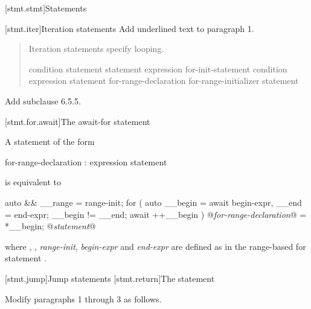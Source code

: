 
[stmt.stmt]{Statements}%

\setcounter{section}{4}
[stmt.iter]{Iteration statements}%
Add underlined text to paragraph 1.

\begin{quote}
\pnum
Iteration statements specify looping.

%
%
%
%
\begin{bnf}
	\br
	 condition \terminal{)} statement\br
	 statement  expression \terminal{) ;}\br
	 for-init-statement condition\opt \terminal{;} expression\opt \terminal{)} statement\br
	 for-range-declaration \terminal{:} for-range-initializer \terminal{)} statement\br
\end{bnf}
\end{quote}

Add subclause 6.5.5.

\setcounter{subsection}{4}
[stmt.for.await]{The await-for statement}%

\pnum
A  statement of the form

\begin{ncbnf}
	 for-range-declaration : expression \terminal{)} statement
\end{ncbnf}

is equivalent to

\begin{codeblock}
	{
		auto && __range = range-init;
		for ( auto __begin = await begin-expr,
		__end = end-expr;
		__begin != __end;
		await ++__begin ) {
			@\textit{for-range-declaration}@ = *__begin;
			@\textit{statement}@
		}
	}
\end{codeblock}

where , , 
\textit{range-init}, \textit{begin-expr} and \textit{end-expr} are defined as in the range-based for statement .

\setcounter{section}{5}
[stmt.jump]{Jump statements}%
\setcounter{subsection}{2}
[stmt.return]{The  statement}%
%
%

Modify paragraphs 1 through 3 as follows.

